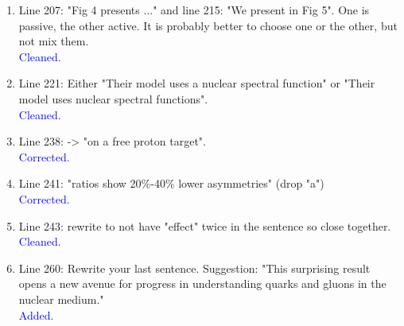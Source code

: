 \documentclass[a4paper,11pt,twoside]{article}
\begin{document}
\begin{enumerate}
\item    Line 207: "Fig 4 presents ..." and line 215: "We present in Fig 5". 
   One is passive, the other active. It is probably better to choose one or the 
      other, but not mix them.\\
   \textcolor{blue}{Cleaned.}

\item    Line 221: Either "Their model uses a nuclear spectral function" or 
   "Their model uses nuclear spectral functions".\\
   \textcolor{blue}{Cleaned.}

\item    Line 238: -> "on a free proton target".\\
   \textcolor{blue}{Corrected. }

\item    Line 241: "ratios show 20\%-40\% lower asymmetries" (drop "a")\\
   \textcolor{blue}{Corrected.}

\item    Line 243: rewrite to not have "effect" twice in the sentence so close together.\\
   \textcolor{blue}{Cleaned.}

\item    Line 260: Rewrite your last sentence. Suggestion: "This surprising 
   result opens a new avenue for progress in understanding quarks and gluons in 
      the nuclear medium."\\
   \textcolor{blue}{Added.}  
  
\end{enumerate}
\end{document}
